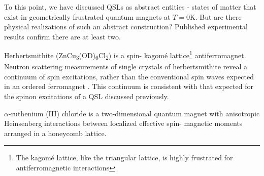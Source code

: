 To this point, we have discussed QSLs as abstract entities - states of matter that exist in geometrically frustrated quantum magnets at $T = 0$K. But are there physical realizations of such an abstract construction? Published experimental results confirm there are at least two.

Herbertsmithite (ZnCu\textsubscript{3}(OD)\textsubscript{6}Cl\textsubscript{2}) is a spin-\textonehalf{} kagom\'{e}{} lattice\footnote{The kagom\'{e} lattice, like the triangular lattice, is highly frustrated for antiferromagnetic interactions} antiferromagnet. Neutron scattering measurements of single crystals of herbertsmithite reveal a continuum of spin excitations, rather than the conventional spin waves expected in an ordered ferromagnet \cite{Han2012}. This continuum is consistent with that expected for the spinon excitations of a QSL discussed previously.

$\alpha$-ruthenium (III) chloride is a two-dimensional quantum magnet with anisotropic Heinsenberg interactions between localized effective spin-\textonehalf{} magnetic moments arranged in a honeycomb lattice.